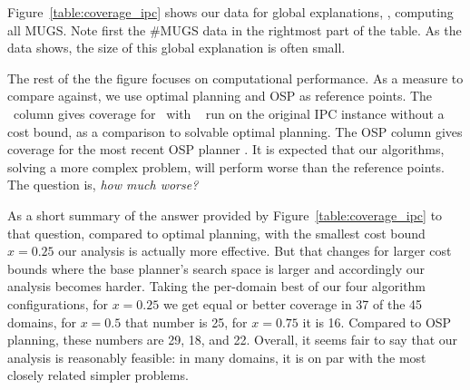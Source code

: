 Figure~\ref{table:coverage_ipc} shows our data for global
explanations, \ie, computing all MUGS.
%
Note first the \#MUGS data in the rightmost part of the table. As the
data shows, the size of this global explanation is often small.
%
%
%
%

The rest of the the figure focuses on computational performance. As a
measure to compare against, we use optimal planning and OSP as
reference points. The \hlmcut\ column gives coverage for \astar\
with \hlmcut\ \cite{helmert:domshlak:icaps-09} run on the original IPC
instance without a cost bound, as a comparison to solvable optimal
planning. The OSP column gives coverage for the most recent OSP
planner \cite{katz:etal:icaps-19}.
%
It is expected that our algorithms, solving a more complex problem,
will perform worse than the reference points. The question
is, \emph{how much worse?}

As a short summary of the answer provided by
Figure~\ref{table:coverage_ipc} to that question, compared to optimal
planning, with the smallest cost bound $x=0.25$ our analysis is
actually more effective. But that changes for larger cost bounds where
the base planner's search space is larger and accordingly our analysis
becomes harder. Taking the per-domain best of our four algorithm
configurations, for $x=0.25$ we get equal or better coverage in 37 of
the 45 domains, for $x=0.5$ that number is 25, for $x=0.75$ it is
16. Compared to OSP planning, these numbers are 29, 18, and
22. Overall, it seems fair to say that our analysis is reasonably
feasible: in many domains, it is on par with the most closely related
simpler problems.

